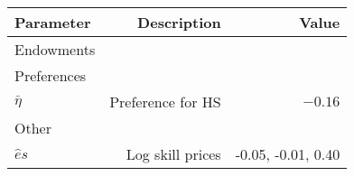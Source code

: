 \begin{tabular}{lrr}
\hline
Parameter & Description  & Value  \\
\hline
Endowments &   &   \\
Preferences &   &   \\
$\bar{\eta}$ & Preference for HS  & $-0.16$  \\
Other &   &   \\
$\hat{e}{s}$ & Log skill prices  & -0.05, -0.01, 0.40  \\
\hline
\end{tabular}%
